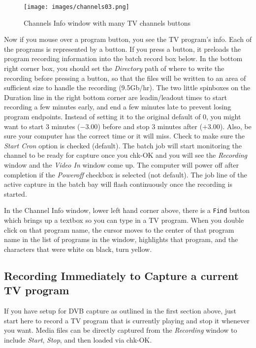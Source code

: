 \begin{figure}[htpb]
    \centering
    \texttt{[image: images/channels03.png]}
    \caption{Channels Info window with many TV channels buttons}
    \label{fig:channels03}
\end{figure}

Now if you mouse over a program button, you see the TV  program's info.  Each of the programs is represented by a button.  If you press a button, it preloads the program recording information into the batch record box below.  In the bottom right corner box, you should set the \textit{Directory} path of where to write the recording before pressing a button, so that the files will be written to an area of sufficient size to handle the recording (9.5Gb/hr).  The two little spinboxes on the Duration line in the right bottom corner are leadin/leadout times to start recording a few minutes early, and end a few minutes late to prevent losing program endpoints.  Instead of setting it to the original default of 0, you might want to start 3 minutes ($-3.00$) before and stop 3 minutes after ($+3.00$).  Also, be sure your computer has the correct time or it will miss.  Check to make sure the \textit{Start Cron} option is checked (default).  The batch job will start monitoring the channel to be ready for capture once you chk-OK and you will see the \textit{Recording} window and the \textit{Video In} window come up.  The computer will power off after completion if the \textit{Poweroff} checkbox is selected (not default).  The job line of the active capture in the batch bay will flash continuously once the recording is started.

In the Channel Info window, lower left hand corner above, there is a \texttt{Find} button which brings up a textbox so you can type in a TV program.  When you double click on that program name, the cursor moves to the center of that program name in the list of programs in the window, highlights that program, and the characters that were white on black, turn yellow.

\subsection{Recording Immediately to Capture a current TV program}%
\label{sub:recording_capture_current_tv_program}

If you have setup for DVB capture as outlined in the first section above, just start here to record a TV program that is currently playing and stop it whenever you want.  Media files can be directly captured from the \textit{Recording} window to include \textit{Start}, \textit{Stop}, and then loaded via chk-OK.

